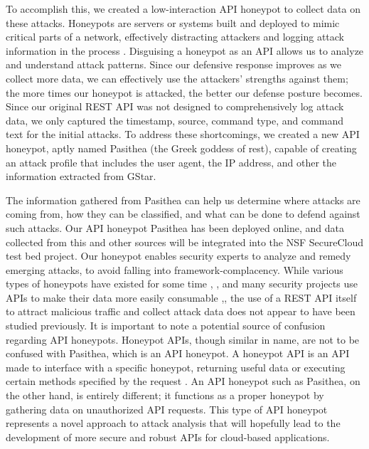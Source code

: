 To accomplish this, we created a low-interaction API honeypot to collect data on these attacks.  Honeypots are servers or systems built and deployed to mimic critical parts of a network, effectively distracting attackers and logging attack information in the process \cite{honeypot-Def}. Disguising a honeypot as an API allows us to analyze and understand attack patterns.  Since our defensive response improves as we collect more data, we can effectively use the attackers' strengths against them; the more times our honeypot is attacked, the better our defense posture becomes.  Since our original REST API was not designed to comprehensively log attack data, we only captured the timestamp, source, command type, and command text for the initial attacks.  To address these shortcomings, we created a new API honeypot, aptly named Pasithea (the Greek goddess of rest), capable of creating an attack profile that includes the user agent, the IP address, and other the information extracted from GStar.

The information gathered from Pasithea can help us determine where attacks are coming from, how they can be classified, and what can be done to defend against such attacks.  Our API honeypot Pasithea has been deployed online, and data collected from this and other sources will be integrated into the NSF SecureCloud test bed project.  Our honeypot enables security experts to analyze and remedy emerging attacks, to avoid falling into framework-complacency.  While various types of honeypots have existed for some time \cite{Stoll:1989:CET:67554}, \cite{Provos:2004:VHF:1251375.1251376}, and many security projects use APIs to make their data more easily consumable \cite{Graham:2008:FAD:1355323},\cite{SCADA-Testbed-API}, the use of a REST API itself to attract malicious traffic and collect attack data does not appear to have been studied previously.  It is important to note a potential source of confusion regarding API honeypots. Honeypot APIs, though similar in name, are not to be confused with Pasithea, which is an API honeypot. A honeypot API is an API made to interface with a specific honeypot, returning useful data or executing certain methods specified by the request \cite{Honeypot-API}. An API honeypot such as Pasithea, on the other hand, is entirely different; it functions as a proper honeypot by gathering data on unauthorized API requests.  This type of API honeypot represents a novel approach to attack analysis that will hopefully lead to the development of more secure and robust APIs for cloud-based applications.

